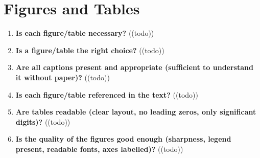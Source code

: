 \section{Figures and Tables}\label{sec:figures}
\begin{enumerate}[resume]
    \item \textbf{Is each figure/table necessary?} 	\textcolor{HighlightColor}{((todo))}
    \item \textbf{Is a figure/table the right choice?} 	\textcolor{HighlightColor}{((todo))}
    \item \textbf{Are all captions present and appropriate (sufficient to understand it without paper)?} 	\textcolor{HighlightColor}{((todo))}
    \item \textbf{Is each figure/table referenced in the text?} 	\textcolor{HighlightColor}{((todo))}
    \item \textbf{Are tables readable (clear layout, no leading zeros, only significant digits)?} 	\textcolor{HighlightColor}{((todo))}
    \item \textbf{Is the quality of the figures good enough (sharpness, legend present, readable fonts, axes labelled)?} 	\textcolor{HighlightColor}{((todo))}
\end{enumerate}

